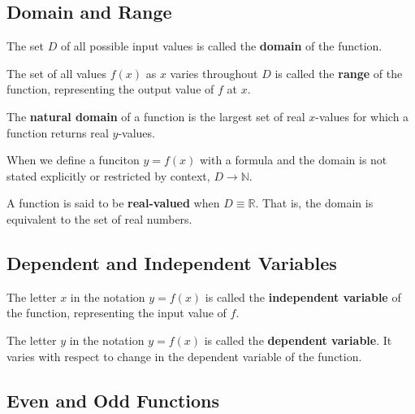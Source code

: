 \subsection{Domain and Range}

\begin{defn}
  The set \(D\) of all possible input values is called the \textbf{domain} of the function.
\end{defn}

\begin{defn}
  The set of all values \(f(x)\) as \(x\) varies throughout \(D\) is called the \textbf{range} of the function, representing the output value of \(f\) at \(x\).
\end{defn}

\begin{defn}
   The \textbf{natural domain} of a function is the largest set of real \(x\)-values for which a function returns real \(y\)-values.
   \begin{remark}
     When we define a funciton \(y=f(x)\) with a formula and the domain is not stated explicitly or restricted by context, \(D \to \mathbb{N}\).
   \end{remark}
\end{defn}

\begin{defn}
  A function is said to be \textbf{real-valued} when \(D \equiv \mathbb{R}\). That is, the domain is equivalent to the set of real numbers.
\end{defn}


\subsection{Dependent and Independent Variables}
\begin{defn}
  The letter \(x\) in the notation \(y=f(x)\) is called the \textbf{independent variable} of the function, representing the input value of \(f\).
\end{defn}
\begin{defn}
  The letter \(y\) in the notation \(y=f(x)\) is called the \textbf{dependent variable}.
  It varies with respect to change in the dependent variable of the function.
\end{defn}

\subsection{Even and Odd Functions}

